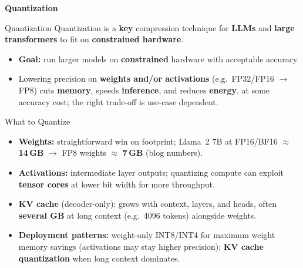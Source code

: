 \begin{frame}[plain]
  \centering
  \vfill
  {\LARGE\bfseries Quantization}
  \vfill
\end{frame}


\begin{frame}{Quantization}
  Quantization is a \textbf{key} compression technique for \textbf{LLMs} and \textbf{large transformers} to fit on \textbf{constrained hardware}. \newline
  \vspace{0.5em}
    \begin{itemize}\itemsep0.32em
      \item[\textcolor{red}{$\blacktriangleright$}] \textbf{Goal:} run larger models on \textbf{constrained} hardware with acceptable accuracy.
      \item[\textcolor{red}{$\blacktriangleright$}] Lowering precision on \textbf{weights and/or activations} (e.g.\ FP32/FP16 $\rightarrow$ FP8) cuts \textbf{memory}, speeds \textbf{inference}, and reduces \textbf{energy}, at some accuracy cost; the right trade-off is use-case dependent.
    \end{itemize}
\end{frame}

\begin{frame}{What to Quantize}
  \begin{itemize}\itemsep0.32em
    \item[\textcolor{red}{$\blacktriangleright$}] \textbf{Weights:} straightforward win on footprint; Llama~2 7B at FP16/BF16 $\approx$ \textbf{14\,GB} $\rightarrow$ FP8 weights $\approx$ \textbf{7\,GB} (blog numbers).
    \item[\textcolor{red}{$\blacktriangleright$}] \textbf{Activations:} intermediate layer outputs; quantizing compute can exploit \textbf{tensor cores} at lower bit width for more throughput.
    \item[\textcolor{red}{$\blacktriangleright$}] \textbf{KV cache} (decoder-only): grows with context, layers, and heads, often \textbf{several GB} at long context (e.g.\ 4096 tokens) alongside weights.
    \item[\textcolor{red}{$\blacktriangleright$}] \textbf{Deployment patterns:} weight-only INT8/INT4 for maximum weight memory savings (activations may stay higher precision); \textbf{KV cache quantization} when long context dominates.
  \end{itemize}
\end{frame}

